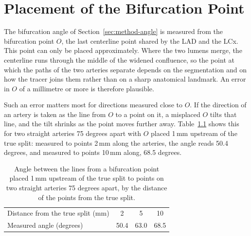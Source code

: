 \chapter{Placement of the Bifurcation Point}
\label{app:angle-origin}

The bifurcation angle of Section~\ref{sec:method-angle} is measured from the bifurcation point $O$, the last centerline point shared by the LAD and the LCx.
This point can only be placed approximately.
Where the two lumens merge, the centerline runs through the middle of the widened confluence, so the point at which the paths of the two arteries separate depends on the segmentation and on how the tracer joins them rather than on a sharp anatomical landmark.
An error in $O$ of a millimetre or more is therefore plausible.

Such an error matters most for directions measured close to $O$.
If the direction of an artery is taken as the line from $O$ to a point on it, a misplaced $O$ tilts that line, and the tilt shrinks as the point moves further away.
Table~\ref{tab:app-angle-tilt} shows this for two straight arteries 75 degrees apart with $O$ placed 1\,mm upstream of the true split: measured to points 2\,mm along the arteries, the angle reads 50.4 degrees, and measured to points 10\,mm along, 68.5 degrees.

\begin{table}[htbp]
  \centering
  \caption{Angle between the lines from a bifurcation point placed 1\,mm upstream of the true split to points on two straight arteries 75 degrees apart, by the distance of the points from the true split.}
  \label{tab:app-angle-tilt}
  \begin{tabular}{lccc}
    \hline
    Distance from the true split (mm) & 2 & 5 & 10 \\
    Measured angle (degrees) & 50.4 & 63.0 & 68.5 \\
    \hline
  \end{tabular}
\end{table}

